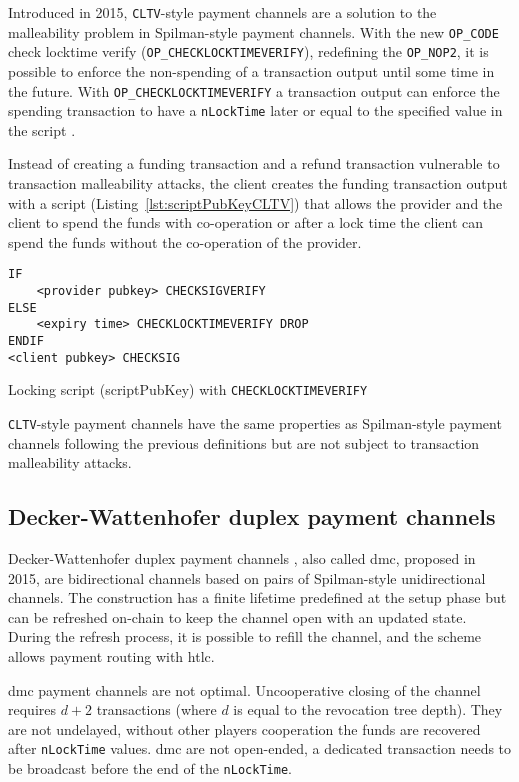 \documentclass{llncs}
\begin{document}
Introduced in 2015, \texttt{CLTV}-style payment channels are a solution to the malleability problem in Spilman-style payment channels. With the new \texttt{OP\_CODE} check locktime verify (\texttt{OP\_CHECKLOCKTIMEVERIFY}), redefining the \texttt{OP\_NOP2}, it is possible to enforce the non-spending of a transaction output until some time in the future. With \texttt{OP\_CHECKLOCKTIMEVERIFY} a transaction output can enforce the spending transaction to have a \texttt{nLockTime} later or equal to the specified value in the script \cite{BIP65}.

Instead of creating a funding transaction and a refund transaction vulnerable to transaction malleability attacks, the client creates the funding transaction output with a script (Listing~\ref{lst:scriptPubKeyCLTV}) that allows the provider and the client to spend the funds with co-operation or after a lock time the client can spend the funds without the co-operation of the provider.

\begin{listing}
  \begin{verbatim}
IF
    <provider pubkey> CHECKSIGVERIFY
ELSE
    <expiry time> CHECKLOCKTIMEVERIFY DROP
ENDIF
<client pubkey> CHECKSIG
  \end{verbatim}
  \caption{Locking script (scriptPubKey) with \texttt{CHECKLOCKTIMEVERIFY}}
  \label{lst:scriptPubKeyCLTV}
\end{listing}

\texttt{CLTV}-style payment channels have the same properties as Spilman-style payment channels following the previous definitions but are not subject to transaction malleability attacks.

\subsection{Decker-Wattenhofer duplex payment channels}

Decker-Wattenhofer duplex payment channels \cite{Decker2015fast}, also called \gls{dmc}, proposed in 2015, are bidirectional channels based on pairs of Spilman-style unidirectional channels. The construction has a finite lifetime predefined at the setup phase but can be refreshed on-chain to keep the channel open with an updated state. During the refresh process, it is possible to refill the channel, and the scheme allows payment routing with \gls{htlc}.

\gls{dmc} payment channels are not optimal. Uncooperative closing of the channel requires $d + 2$ transactions (where $d$ is equal to the revocation tree depth).  They are not undelayed, without other players cooperation the funds are recovered after \texttt{nLockTime} values. \gls{dmc} are not open-ended, a dedicated transaction needs to be broadcast before the end of the \texttt{nLockTime}.
\end{document}
